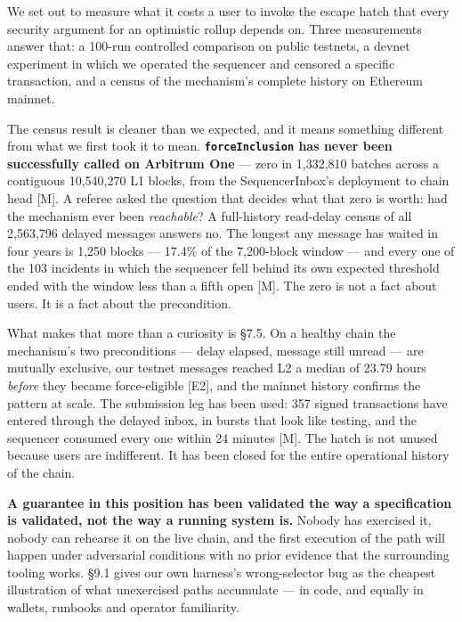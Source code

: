 \documentclass[conference]{IEEEtran}
\renewcommand{\_}{\textunderscore\allowbreak}
\begin{document}
We set out to measure what it costs a user to invoke the escape hatch
that every security argument for an optimistic rollup depends on. Three
measurements answer that: a 100-run controlled comparison on public
testnets, a devnet experiment in which we operated the sequencer and
censored a specific transaction, and a census of the mechanism's
complete history on Ethereum mainnet.

The census result is cleaner than we expected, and it means something
different from what we first took it to mean.
\textbf{\texttt{forceInclusion} has never been successfully called on
Arbitrum One} --- zero in 1,332,810 batches across a contiguous
10,540,270 L1 blocks, from the SequencerInbox's deployment to chain head
{[}M{]}. A referee asked the question that decides what that zero is
worth: had the mechanism ever been \emph{reachable}? A full-history
read-delay census of all 2,563,796 delayed messages answers no. The
longest any message has waited in four years is 1,250 blocks --- 17.4\%
of the 7,200-block window --- and every one of the 103 incidents in
which the sequencer fell behind its own expected threshold ended with
the window less than a fifth open {[}M{]}. The zero is not a fact about
users. It is a fact about the precondition.

What makes that more than a curiosity is §7.5. On a healthy chain the
mechanism's two preconditions --- delay elapsed, message still unread
--- are mutually exclusive, our testnet messages reached L2 a median of
23.79 hours \emph{before} they became force-eligible {[}E2{]}, and the
mainnet history confirms the pattern at scale. The submission leg has
been used: 357 signed transactions have entered through the delayed
inbox, in bursts that look like testing, and the sequencer consumed
every one within 24 minutes {[}M{]}. The hatch is not unused because
users are indifferent. It has been closed for the entire operational
history of the chain.

\textbf{A guarantee in this position has been validated the way a
specification is validated, not the way a running system is.} Nobody has
exercised it, nobody can rehearse it on the live chain, and the first
execution of the path will happen under adversarial conditions with no
prior evidence that the surrounding tooling works. §9.1 gives our own
harness's wrong-selector bug as the cheapest illustration of what
unexercised paths accumulate --- in code, and equally in wallets,
runbooks and operator familiarity.
\end{document}
